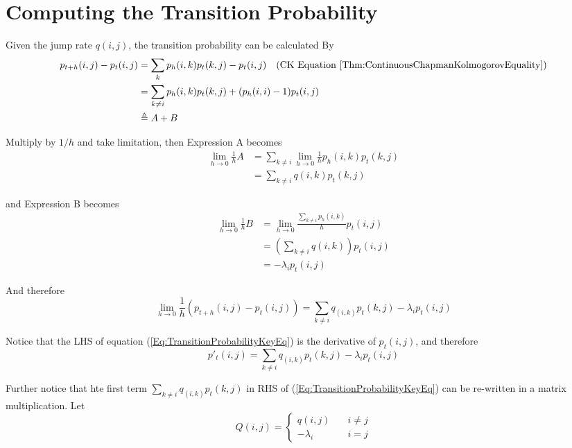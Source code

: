 \section{Computing the Transition Probability}
    Given the jump rate $q(i,j)$, the transition probability can be calculated By
    \begin{align*}
        p_{t+h}(i,j) - p_t(i,j) &= \sum_k p_h(i,k)p_t(k,j) - p_t(i,j) \quad \text{(CK Equation \ref{Thm:ContinuousChapmanKolmogorovEquality})}\\
        &= \sum_{k \neq i} p_h(i,k)p_t(k,j) + (p_h(i,i)-1)p_t(i,j)\\
        &\triangleq A + B
    \end{align*}

    Multiply by $1/h$ and take limitation, then Expression A becomes
    \begin{align*}
        \lim_{h \to 0} \frac{1}{h}A &= \sum_{k \neq i}\lim_{h \to 0}\frac{1}{h}p_h(i,k)p_t(k,j)\\
        &= \sum_{k \neq i}q(i,k)p_t(k,j)
    \end{align*}

    and Expression B becomes
    \begin{align*}
        \lim_{h \to 0} \frac{1}{h}B &= \lim_{h \to 0}\frac{\sum_{k \neq i}p_h(i,k)}{h}p_t(i,j)\\
        &= \left(\sum_{k \neq i}q(i,k)\right)p_t(i,j)\\
        &= -\lambda_i p_t(i,j)
    \end{align*}

    And therefore
    \begin{equation}\label{Eq:TransitionProbabilityKeyEq}
         \lim_{h \to 0}\frac{1}{h}\left(p_{t+h}(i,j) - p_t(i,j)\right) = \sum_{k \neq i}q_(i,k)p_t(k,j) - \lambda_i p_t(i,j) 
    \end{equation}

    Notice that the LHS of equation (\ref{Eq:TransitionProbabilityKeyEq}) is the derivative of $p_t(i,j)$, and therefore
    \[ p'_t(i,j) = \sum_{k \neq i}q_(i,k)p_t(k,j) - \lambda_i p_t(i,j) \]

    Further notice that  hte first term $\sum_{k \neq i}q_(i,k)p_t(k,j)$ in RHS of (\ref{Eq:TransitionProbabilityKeyEq}) can be re-written in a matrix multiplication. Let
    \[ Q(i,j) = \begin{cases}
        q(i,j) &\quad i \neq j\\
        -\lambda_i &\quad i = j
    \end{cases} \]

